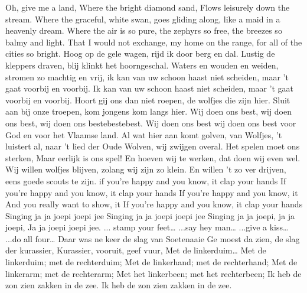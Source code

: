 \documentclass{article}
\begin{document}
\begin{songs}{}
\endchorus
\beginverse
Oh, give me a land,
Where the bright diamond sand, 
Flows leisurely down the stream.
Where the graceful, white swan,
goes gliding along,
like a maid in a heavenly dream.
\endverse
\beginverse
Where the air is so pure,
the zephyrs so free,
the breezes so balmy and light.
That I would not exchange,
my home on the range,
for all of the cities so bright.
\endverse
\endsong
{}
\beginverse*
Hoog op de gele wagen, rijd ik door berg en dal.
Lustig de kleppers draven, blij klinkt het hoorngeschal.
Waters en wouden en weiden, stromen zo machtig en vrij,
ik kan van uw schoon haast niet scheiden,
maar 't gaat voorbij en voorbij.
Ik kan van uw schoon haast niet scheiden,
maar 't gaat voorbij en voorbij.
\endverse
\endsong
{}
\beginverse
Hoort gij ons dan niet roepen,
de wolfjes die zijn hier. 
Sluit aan bij onze troepen,
kom jongens kom langs hier.
\endverse
\beginchorus
Wij doen ons best,
wij doen ons best,
wij doen ons bestebestebest.
Wij doen ons best
wij doen ons best
voor God en voor het Vlaamse land.
\endchorus
\beginverse
Al wat hier aan komt golven,
van Wolfjes, 't luistert al,
naar 't lied der Oude Wolven,
wij zwijgen overal.
\endverse
\beginverse
Het spelen moet ons sterken,
Maar eerlijk is ons spel!
En hoeven wij te werken,
dat doen wij even wel.
\endverse
\beginverse
Wij willen wolfjes blijven,
zolang wij zijn zo klein.
En willen 't zo ver drijven,
eens goede scouts te zijn.
\endverse
\endsong
{}
\beginverse
if you’re happy and you know, it clap your hands
If you’re happy and you know, it clap your hands
If you’re happy and you know, it
And you really want to show, it
If you’re happy and you know, it clap your hands
\endverse
\beginchorus
Singing ja ja joepi joepi jee
Singing ja ja joepi joepi jee
Singing ja ja joepi, ja ja joepi,
Ja ja joepi joepi jee.
\endchorus
\beginverse
... stamp your feet…
\endverse
\beginverse
...say hey man…
\endverse
\beginverse
...give a kiss…
\endverse
\beginverse
...do all four…
\endverse
\endsong
{}
\beginverse*
Daar was ne keer de slag van Soetenaaie
Ge moest da zien, de slag der kurassier,
Kurassier, vooruit, geef vuur,
Met de linkerduim… 
\endverse
\beginchorus
Met de linkerduim; met de rechterduim;
Met de linkerhand; met de rechterhand;
Met de linkerarm; met de rechterarm;
Met het linkerbeen; met het rechterbeen; 
\endchorus
\endsong
{}
\beginverse
Ik heb de zon zien zakken in de zee.
Ik heb de zon zien zakken in de zee.

\end{songs}
\end{document}
